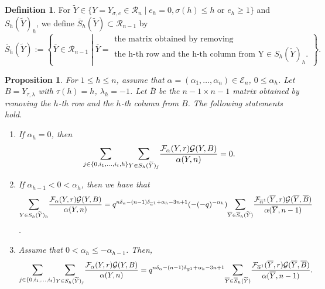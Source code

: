 \documentclass[11pt,oneside]{amsart}
\theoremstyle{plain}
\newtheorem{proposition}[theorem]{Proposition}
\theoremstyle{definition}
\newtheorem{definition}[theorem]{Definition}
\theoremstyle{remark}
\newcommand{\tx}[1]{\text{#1}}
\newcommand{\CE}{{\mathcal E}}
\newcommand{\CF}{{\mathcal F}}
\newcommand{\CG}{{\mathcal G}}
\newcommand{\CR}{{\mathcal R}}
\numberwithin{equation}{section}
\begin{document}
	\begin{definition}\label{definition2.18}
		For $\widetilde{Y} \in \lbrace Y=Y_{\sigma,e} \in \CR_n \mid e_h=0, \sigma(h)\leq h \tx{ or } e_h \geq 1 \rbrace$ and $S_h(\widetilde{Y})_h$, we define $\overline{S}_h(\widetilde{Y}) \subset \CR_{n-1}$ by
		\begin{equation*}
			\overline{S}_h(\widetilde{Y}):=\left\lbrace \overline{Y} \in \CR_{n-1} \middle\vert \overline{Y}=\begin{array}{l} \tx{the matrix obtained by removing} \\ \tx{the h-th row and the h-th column from Y} \in S_h(\widetilde{Y})_h.
			\end{array}\right \rbrace.
		\end{equation*}
	\end{definition}
	\begin{proposition}\label{proposition2.19}
		For $1 \leq h \leq n$, assume that $\alpha=(\alpha_1,\dots,\alpha_n) \in \CE_n$, $0 \leq \alpha_h$. Let $B=Y_{\tau, \lambda}$ with $\tau(h)=h$, $\lambda_h=-1$. Let $\overline{B}$ be the $n-1 \times n-1$ matrix obtained by removing the $h$-th row and the $h$-th column from $B$. The following statements hold.
		\begin{enumerate}
			\item If $\alpha_h=0$, then 
			\begin{equation*}
				\mathlarger{\sum}_{j \in \lbrace 0,i_1,\dots,i_t,h \rbrace}\mathlarger{\sum}_{Y \in S_h(\widetilde{Y})_{j}}	\dfrac{\CF_{\alpha}(Y,r)\CG(Y,B)}{\alpha(Y,n)}=0.
			\end{equation*}
			\item If $\alpha_{h-1}< 0 <\alpha_h$, then we have that
			\begin{equation}\label{eq2.15}\mathlarger{\sum}_{Y \in S_h(\widetilde{Y})_{h}}	\dfrac{\CF_{\alpha}(Y,r)\CG(Y,B)}{\alpha(Y,n)}=q^{n\delta_{\alpha}-(n-1)\delta_{\overline{\alpha}^1}+\alpha_h-3n+1}(-(-q)^{-\alpha_h})\mathlarger{\sum}_{\overline{Y} \in \overline{S}_h(\widetilde{Y})}\dfrac{\CF_{\overline{\alpha}^1}(\overline{Y},r)\CG(\overline{Y},\overline{B})}{\alpha(\overline{Y},n-1)}\end{equation}.
			
			\item Assume that $0<\alpha_h \leq -\alpha_{h-1}$. Then,
			\begin{equation}\label{eq2.16}
				\mathlarger{\sum}_{j \in \lbrace 0,i_1,\dots,i_t \rbrace}\mathlarger{\sum}_{Y \in S_h(\widetilde{Y})_{j}}	\dfrac{\CF_{\alpha}(Y,r)\CG(Y,B)}{\alpha(Y,n)}=q^{n\delta_{\alpha}-(n-1)\delta_{\overline{\alpha}^1}+\alpha_h-3n+1}\mathlarger{\sum}_{\overline{Y} \in \overline{S}_h(\widetilde{Y})}\dfrac{\CF_{\overline{\alpha}^1}(\overline{Y},r)\CG(\overline{Y},\overline{B})}{\alpha(\overline{Y},n-1)}.
			\end{equation}
		\end{enumerate}
		

\end{proposition}
\end{document}
